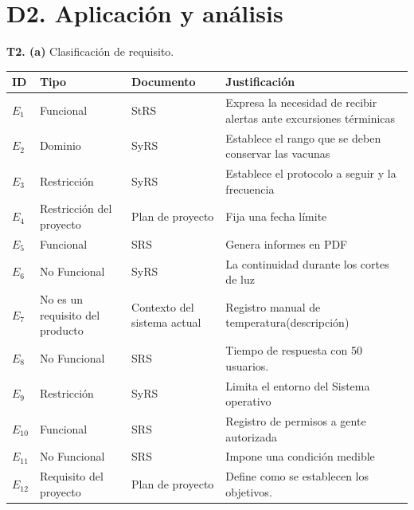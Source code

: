 \documentclass{article}
\begin{document}
\section*{D2. Aplicación y análisis}
\textbf{T2. (a)} Clasificación de requisito.
\begin{center}
\begin{tabular}{|p{1cm}|p{2cm}|p{2cm}|p{5.5cm}|}
\hline
\textbf{ID} & \textbf{Tipo} & \textbf{Documento} & \textbf{Justificación} \\ \hline
$E_1$ & Funcional & StRS & Expresa la necesidad de recibir alertas ante excursiones términicas \\ \hline
$E_2$ & Dominio & SyRS & Establece el rango que se deben conservar las vacunas \\ \hline
$E_3$ & Restricción & SyRS & Establece el protocolo a seguir y la frecuencia \\ \hline
$E_4$ & Restricción del proyecto & Plan de proyecto & Fija una fecha límite \\ \hline
$E_5$ & Funcional & SRS & Genera informes en PDF \\ \hline
$E_6$ & No Funcional & SyRS & La continuidad durante los cortes de luz \\ \hline
$E_7$ & No es un requisito del producto & Contexto del sistema actual & Registro manual de temperatura(descripción) \\ \hline
$E_8$ & No Funcional & SRS & Tiempo de respuesta con 50 usuarios.\\ \hline
$E_9$ & Restricción & SyRS & Limita el entorno del Sistema operativo \\ \hline
$E_{10}$ & Funcional & SRS & Registro de permisos a gente autorizada \\ \hline
$E_{11}$ & No Funcional & SRS & Impone una condición medible \\ \hline
$E_{12}$ & Requisito del proyecto & Plan de proyecto & Define como se establecen los objetivos. \\ \hline
\end{tabular}
\end{center}
\end{document}
